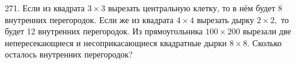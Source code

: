 271. Если из квадрата $3\times3$ вырезать центральную клетку, то в нём будет 8 внутренних перегородок. Если же из квадрата $4\times4$ вырезать дырку $2\times2,$ то будет 12 внутренних перегородок. Из прямоугольника $100\times200$ вырезали две непересекающиеся и несоприкасающиеся квадратные дырки $8\times8.$ Сколько осталось внутренних перегородок?\\
